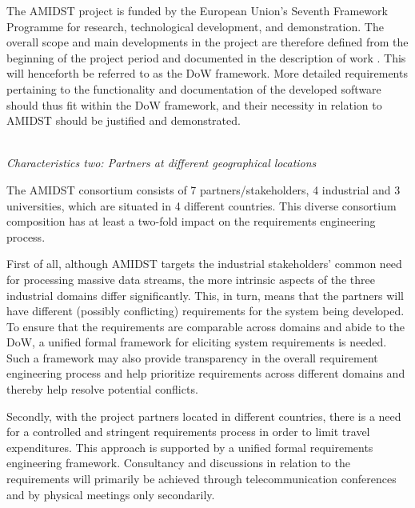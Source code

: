 The AMIDST project is funded by the European Union's Seventh Framework Programme for research, technological
development, and demonstration. The overall scope and main developments in the project are therefore defined from the
beginning of the project period and documented in the description of work \cite{}. This will henceforth be referred to
as the DoW framework. More detailed requirements pertaining
to the functionality and documentation of the developed software should thus fit within the DoW framework, and their
necessity in relation to AMIDST should be justified and demonstrated.   


 


\ \\
\noindent \emph{Characteristics two: Partners at different geographical locations}
\label{sec:characteristic2}

The AMIDST consortium consists of 7 partners/stakeholders, 4 industrial and 3 universities, which are situated in 4 different
countries. This diverse consortium composition has at least a two-fold impact on the requirements engineering process.

First of
all, although AMIDST targets the industrial stakeholders' common need for processing massive data streams, the more
intrinsic aspects of the three industrial domains differ significantly. This, in turn, means that the partners will have different
(possibly conflicting) requirements for the system being developed. To ensure that the requirements are comparable
across domains and abide to the DoW, a unified formal framework for eliciting system requirements is needed. Such a
framework may also provide transparency in the overall requirement engineering process and help prioritize requirements
across different domains and thereby help resolve potential conflicts.   

Secondly, with the project partners located in different countries, there is a need for a controlled and stringent requirements
process in order to limit travel expenditures. This approach is supported by a unified formal requirements
engineering framework. Consultancy and discussions in relation to the
requirements will primarily be achieved through telecommunication conferences and by physical meetings only secondarily. 
 
